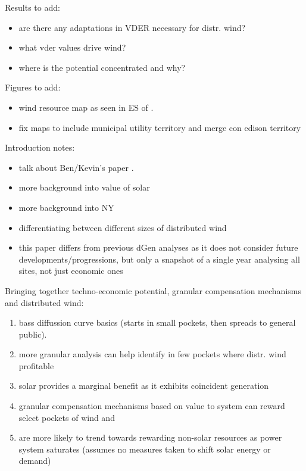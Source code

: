 Results to add:
\begin{itemize}
\item are there any adaptations in VDER necessary for distr. wind?
\item what vder values drive wind?
\item where is the potential concentrated and why?
\end{itemize}

Figures to add:
\begin{itemize}
\item wind resource map as seen in ES of \cite{mccabe_assessment_2018}.
\item fix maps to include municipal utility territory and merge con edison territory
\end{itemize}

Introduction notes:
\begin{itemize}
\item talk about Ben/Kevin's paper \citet*{mccabe_assessment_2018}.
\item more background into value of solar \citet*{denholm_methods_2014}
\item more background into NY
\item differentiating between different sizes of distributed wind
\item this paper differs from previous dGen analyses as it does not consider future developments/progressions, but only a snapshot of a single year analysing all sites, not just economic ones
\end{itemize}

Bringing together techno-economic potential, granular compensation mechanisms and distributed wind:
\begin{enumerate}
\item bass diffussion curve basics (starts in small pockets, then spreads to general public).
\item more granular analysis can help identify in few pockets where distr. wind profitable
\item solar provides a marginal benefit as it exhibits coincident generation
\item granular compensation mechanisms based on value to system can reward select pockets of wind and
\item are more likely to trend towards rewarding non-solar resources as power system saturates (assumes no measures taken to shift solar energy or demand)
\end{enumerate}

\vspace{25mm}
